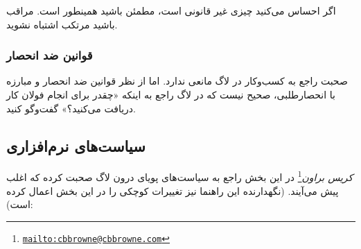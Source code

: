 
اگر احساس می‌کنید چیزی غیر قانونی است، مطمئن باشید همینطور است. مراقب باشید مرتکب اشتباه نشوید.

\subsubsection{قوانین ضد انحصار}
صحبت راجع به کسب‌وکار در لاگ مانعی ندارد. اما از نظر قوانین ضد انحصار و مبارزه با انحصارطلبی، صحیح نیست
که در لاگ راجع به اینکه «چقدر برای انجام فولان کار دریافت می‌کنید؟» گفت‌وگو کنید.

\subsection{سیاست‌های نرم‌افزاری}
\emph{کریس براون}\footnote{\texttt{\url{mailto:cbbrowne@cbbrowne.com}}}
در این بخش راجع به سیاست‌های پویای درون لاگ صحبت کرده که اغلب پیش می‌آیند.
(نگهدارنده این راهنما نیز تغییرات کوچکی را در این بخش اعمال کرده است):


